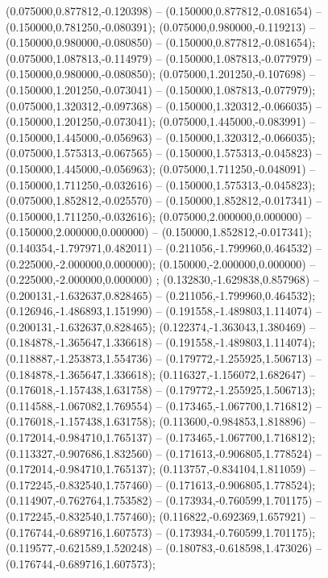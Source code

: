  (0.075000,0.877812,-0.120398) -- (0.150000,0.877812,-0.081654) -- (0.150000,0.781250,-0.080391);
 (0.075000,0.980000,-0.119213) -- (0.150000,0.980000,-0.080850) -- (0.150000,0.877812,-0.081654);
 (0.075000,1.087813,-0.114979) -- (0.150000,1.087813,-0.077979) -- (0.150000,0.980000,-0.080850);
 (0.075000,1.201250,-0.107698) -- (0.150000,1.201250,-0.073041) -- (0.150000,1.087813,-0.077979);
 (0.075000,1.320312,-0.097368) -- (0.150000,1.320312,-0.066035) -- (0.150000,1.201250,-0.073041);
 (0.075000,1.445000,-0.083991) -- (0.150000,1.445000,-0.056963) -- (0.150000,1.320312,-0.066035);
 (0.075000,1.575313,-0.067565) -- (0.150000,1.575313,-0.045823) -- (0.150000,1.445000,-0.056963);
 (0.075000,1.711250,-0.048091) -- (0.150000,1.711250,-0.032616) -- (0.150000,1.575313,-0.045823);
 (0.075000,1.852812,-0.025570) -- (0.150000,1.852812,-0.017341) -- (0.150000,1.711250,-0.032616);
 (0.075000,2.000000,0.000000) -- (0.150000,2.000000,0.000000) -- (0.150000,1.852812,-0.017341);
 (0.140354,-1.797971,0.482011) -- (0.211056,-1.799960,0.464532) -- (0.225000,-2.000000,0.000000);
 (0.150000,-2.000000,0.000000) -- (0.225000,-2.000000,0.000000) ;
 (0.132830,-1.629838,0.857968) -- (0.200131,-1.632637,0.828465) -- (0.211056,-1.799960,0.464532);
 (0.126946,-1.486893,1.151990) -- (0.191558,-1.489803,1.114074) -- (0.200131,-1.632637,0.828465);
 (0.122374,-1.363043,1.380469) -- (0.184878,-1.365647,1.336618) -- (0.191558,-1.489803,1.114074);
 (0.118887,-1.253873,1.554736) -- (0.179772,-1.255925,1.506713) -- (0.184878,-1.365647,1.336618);
 (0.116327,-1.156072,1.682647) -- (0.176018,-1.157438,1.631758) -- (0.179772,-1.255925,1.506713);
 (0.114588,-1.067082,1.769554) -- (0.173465,-1.067700,1.716812) -- (0.176018,-1.157438,1.631758);
 (0.113600,-0.984853,1.818896) -- (0.172014,-0.984710,1.765137) -- (0.173465,-1.067700,1.716812);
 (0.113327,-0.907686,1.832560) -- (0.171613,-0.906805,1.778524) -- (0.172014,-0.984710,1.765137);
 (0.113757,-0.834104,1.811059) -- (0.172245,-0.832540,1.757460) -- (0.171613,-0.906805,1.778524);
 (0.114907,-0.762764,1.753582) -- (0.173934,-0.760599,1.701175) -- (0.172245,-0.832540,1.757460);
 (0.116822,-0.692369,1.657921) -- (0.176744,-0.689716,1.607573) -- (0.173934,-0.760599,1.701175);
 (0.119577,-0.621589,1.520248) -- (0.180783,-0.618598,1.473026) -- (0.176744,-0.689716,1.607573);
